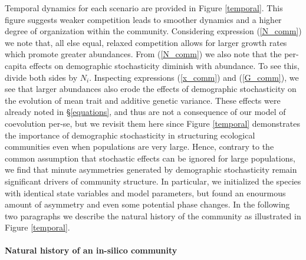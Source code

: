 \documentclass[]{elsarticle} %
\begin{document}
Temporal dynamics for each scenario are provided in Figure
\ref{temporal}. This figure suggests weaker competition leads to
smoother dynamics and a higher degree of organization within the
community. Considering expression (\ref{N_comm}) we note that, all else
equal, relaxed competition allows for larger growth rates which promote
greater abundances. From (\ref{N_comm}) we also note that the per-capita
effects on demographic stochasticity diminish with abundance. To see
this, divide both sides by \(N_i\). Inspecting expressions
(\ref{x_comm}) and (\ref{G_comm}), we see that larger abundances also
erode the effects of demographic stochasticity on the evolution of mean
trait and additive genetic variance. These effects were already noted in
\S\ref{equations}, and thus are not a consequence of our model of
coevolution per-se, but we revisit them here since Figure \ref{temporal}
demonstrates the importance of demographic stochasticity in structuring
ecological communities even when populations are very large. Hence,
contrary to the common assumption that stochastic effects can be ignored
for large populations, we find that minute asymmetries generated by
demographic stochasticity remain significant drivers of community
structure. In particular, we initialized the species with identical
state variables and model parameters, but found an enourmous amount of
asymmetry and even some potential phase changes. In the following two
paragraphs we describe the natural history of the community as
illustrated in Figure \ref{temporal}.

\paragraph{Natural history of an in-silico community}
\end{document}
